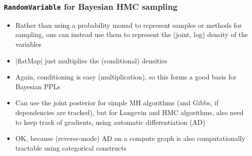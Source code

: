 \documentclass[mathserif,handout]{beamer}
\begin{document}
\begin{frame}[fragile]
  \frametitle{\texttt{RandomVariable} for Bayesian HMC sampling}
  \begin{itemize}
  \item Rather than using a probability monad to represent samples or methods for sampling, one can instead use them to represent the (joint, log) density of the variables
    \item |flatMap| just multiplies the (conditional) densities
    \item Again, conditioning is easy (multiplication), so this forms a good basis for Bayesian PPLs
    \item Can use the joint posterior for simple MH algorithms (and Gibbs, if dependencies are tracked), but for Langevin and HMC algorithms, also need to keep track of gradients, using automatic differentiation (AD)
      \item OK, because (reverse-mode) AD on a compute graph is also computationally tractable using categorical constructs
    \end{itemize}
\end{frame}

\end{document}
